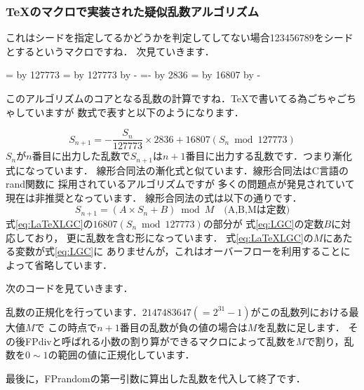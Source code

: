 \subsubsection{\TeX のマクロで実装された疑似乱数アルゴリズム}
\begin{texcode}
\ifnum{}%
\else%
\fi%
\end{texcode}
これはシードを指定してるかどうかを判定してしてない場合123456789をシードとするというマクロですね．
次見ていきます．
\begin{texcode}
\FP@xia=\FPseed%
\divide\FP@xia by 127773%
\FP@xib=\FP@xia%
\multiply\FP@xib by 127773%
\advance\FP@xib by -\FPseed%
\FP@xib=-\FP@xib%
\multiply\FP@xia by 2836%
\FPseed=\FP@xib%
\multiply\FPseed by 16807%
\advance\FPseed by -\FP@xia%
\end{texcode}
このアルゴリズムのコアとなる乱数の計算ですね．\TeX で書いてる為ごちゃごちゃしていますが
数式で表すと以下のようになります．

\begin{equation}\label{eq:LaTeXLGC}
S_{n+1} = - \dfrac{S_n}{127773}\times 2836 + 16807(S_n \bmod 127773)
\end{equation}
$S_n$が$n$番目に出力した乱数で$S_{n+1}$は$n+1$番目に出力する乱数です．つまり漸化式になっています．
線形合同法の漸化式と似ています．線形合同法はC言語のrand関数に
採用されているアルゴリズムですが
多くの問題点が発見されていて現在は非推奨となっています．
線形合同法の式は以下の通りです．
\begin{equation}\label{eq:LGC}
S_{n+1}=(A\times S_n + B) \bmod M \quad \textrm{(A,B,Mは定数)}
\end{equation}
式\eqref{eq:LaTeXLGC}の$16807(S_n \bmod 127773)$の部分が
式\eqref{eq:LGC}の定数$B$に対応しており，
更に乱数を含む形になっています．
式\eqref{eq:LaTeXLGC}の$M$にあたる変数が式\eqref{eq:LGC}に
ありませんが，これはオーバーフローを利用することによって省略しています．

次のコードを見ていきます．
乱数の正規化を行っています．$2147483647(=2^{31}-1)$がこの乱数列における最大値$M$で
この時点で$n+1$番目の乱数が負の値の場合は$M$を乱数に足します．
その後FPdivと呼ばれる小数の割り算ができるマクロによって乱数を$M$で割り，乱数を$0\sim 1$の範囲の値に正規化しています．
最後に，FPrandomの第一引数に算出した乱数を代入して終了です．
